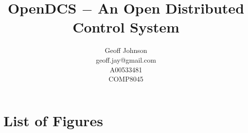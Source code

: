 \documentclass[11pt]{article}
\begin{document}
\nocite{*}

  \title{%
    OpenDCS $-$ An Open Distributed Control System\vspace{2em}
  }

  \author{%
    Geoff Johnson \vspace{0.5em} \\
    geoff.jay@gmail.com \vspace{0.5em} \\
    A00533481 \vspace{0.5em} \\
    COMP8045 \vspace{0.5em}
  }

  \maketitle
  \thispagestyle{empty}
  \newpage
  \mbox{}
  \thispagestyle{empty}

  \newpage
  \addtocounter{page}{-1}
  \tableofcontents

  \newpage


  

  \newpage
  

  \newpage
  

  \newpage
  

  \newpage
  

  \newpage
  

  \newpage
  

  \newpage
  

  \newpage
  

	\newpage
  

  \newpage
  

  \newpage
  

  \newpage
  \printbibliography%

  \newpage
  \addappheadtotoc%
  \appendix
  \appendixpage%

  \section{List of Figures}\label{app:list-figures}
    \listoffigures
\end{document}
